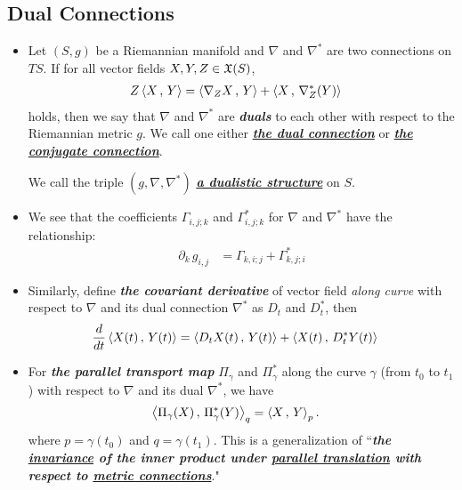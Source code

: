 \documentclass[11pt]{article}
\begin{document}
\subsection{Dual Connections}
\begin{itemize}
\item 
\begin{definition} 
Let $(S, g)$ be a Riemannian manifold and $\nabla$ and $\nabla^{*}$ are two connections on $TS$. If for all vector fields $X, Y, Z \in {\mathfrak X}(S)$, 
\begin{align}
Z\left\langle X\,,\, Y \right\rangle &= \left\langle \nabla_{Z}{X}\,,\, Y \right\rangle + \left\langle X\,,\, \nabla^{*}_{Z}(Y) \right\rangle   \label{eqn: dual_connections}
\end{align} holds, then we say that $\nabla$ and $\nabla^{*}$ are \emph{\textbf{duals}} to each other with respect to the Riemannian metric $g$. We call one either \underline{\emph{\textbf{the dual connection}}}   or \underline{\emph{\textbf{the conjugate connection}}}.

We call the triple $(g, \nabla, \nabla^{*})$ \underline{\emph{\textbf{a dualistic structure}}} on $S$.
\end{definition}

\item We see that the coefficients $\Gamma_{i,j;k}$ and $\Gamma^{*}_{i,j;k}$ for $\nabla$ and $\nabla^{*}$ have the relationship:
\begin{align*}
\partial_k\,g_{i,j} &= \Gamma_{k,i; j} + \Gamma_{k,j; i}^{*}
\end{align*}

\item Similarly, define \emph{\textbf{the covariant derivative}} of vector field \emph{along curve} with respect to $\nabla$ and its dual connection $\nabla^{*}$ as $D_t$ and $D_t^{*}$, then 
\begin{align*}
\frac{d}{dt}\left\langle X(t)\,,\, Y(t) \right\rangle &= \left\langle D_tX(t)\,,\, Y(t) \right\rangle + \left\langle X(t)\,,\, D_t^{*}Y(t) \right\rangle
\end{align*}

\item For \emph{\textbf{the parallel transport map}} $\Pi_{\gamma}$ and $\Pi^{*}_{\gamma}$ along the curve $\gamma$ (from $t_0$ to $t_1$) with respect to $\nabla$ and its dual $\nabla^{*}$, we have 
\begin{align*}
\left\langle \Pi_{\gamma}(X)\,,\, \Pi^{*}_{\gamma}(Y) \right\rangle_q &= \left\langle X\,,\, Y \right\rangle_p.
\end{align*} where $p=\gamma(t_0)$ and $q = \gamma(t_1)$. This is a generalization of ``\emph{\textbf{the \underline{invariance} of the inner product under \underline{parallel translation} with respect to \underline{metric connections}}}."


\end{itemize}
\end{document}
